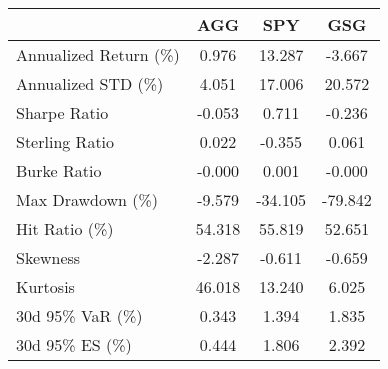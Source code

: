 \begin{tabular}{lccc}
\toprule
{} &     AGG &     SPY &     GSG \\
\midrule
Annualized Return (\%) &   0.976 &  13.287 &  -3.667 \\
Annualized STD (\%)    &   4.051 &  17.006 &  20.572 \\
Sharpe Ratio          &  -0.053 &   0.711 &  -0.236 \\
Sterling Ratio        &   0.022 &  -0.355 &   0.061 \\
Burke Ratio           &  -0.000 &   0.001 &  -0.000 \\
Max Drawdown (\%)      &  -9.579 & -34.105 & -79.842 \\
Hit Ratio (\%)         &  54.318 &  55.819 &  52.651 \\
Skewness              &  -2.287 &  -0.611 &  -0.659 \\
Kurtosis              &  46.018 &  13.240 &   6.025 \\
30d 95\% VaR (\%)       &   0.343 &   1.394 &   1.835 \\
30d 95\% ES (\%)        &   0.444 &   1.806 &   2.392 \\
\bottomrule
\end{tabular}
